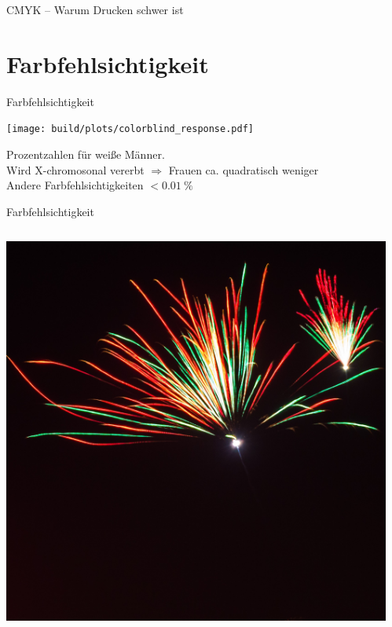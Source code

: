 \documentclass[aspectratio=1610, 9pt]{beamer}
\begin{document}
\begin{frame}{CMYK – Warum Drucken schwer ist}
\end{frame}


\section{Farbfehlsichtigkeit}
\begin{frame}[t]{Farbfehlsichtigkeit}
  \begin{center}
    \texttt{[image: build/plots/colorblind\_response.pdf]}
  \end{center}
  
  Prozentzahlen für weiße Männer. \\
  Wird X-chromosonal vererbt ${}⇒{}$ Frauen ca. quadratisch weniger\\
  Andere Farbfehlsichtigkeiten ${}< \SI{0.01}{\percent}$
\end{frame}

\begin{frame}[t]{Farbfehlsichtigkeit}
  \begin{columns}[onlytextwidth]%
    \begin{column}{0.495\textwidth}%
      \includegraphics[width=\linewidth]{images/feuerwerk.jpg}\\
    \end{column}%
    \hfill%
    \begin{column}{0.495\textwidth}%
    \end{column}%
  \end{columns}%

  \begin{center}%
  \end{center}%
\end{frame}
\end{document}
